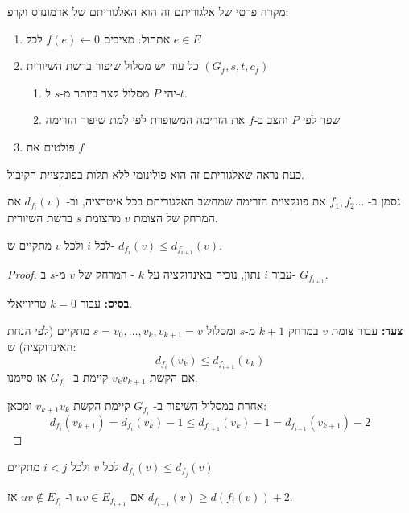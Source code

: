 מקרה פרטי של אלגוריתם זה הוא האלגוריתם של אדמונדס וקרפ:

\begin{enumerate}
\item
אתחול: מציבים 
$f(e) \leftarrow 0$
לכל
$e \in E$

\item
כל עוד יש מסלול שיפור ברשת השיורית
$(G_f, s, t, c_f)$
\begin{enumerate}
\item
יהי $P$ מסלול קצר ביותר מ-$s$ ל-$t$.
\item
שפר לפי $P$ והצב ב-$f$ את הזרימה המשופרת לפי למת שיפור הזרימה
\end{enumerate}
\item
פולטים את $f$
\end{enumerate}


כעת נראה שאלגוריתם זה הוא פולינומי ללא תלות בפונקציית הקיבול.

נסמן ב-%
$f_1, f_2 \ldots $
את פונקציית הזרימה שמחשב האלגוריתם בכל איטרציה, וב-%
$d_{f_i}(v)$
את המרחק של הצומת $v$ מהצומת $s$ ברשת השיורית.

\begin{claim}
לכל $i$ ולכל $v$ מתקיים ש-%
$d_{f_i}(v) \leq d_{f_{i+1}}(v)$.
\end{claim}

\begin{proof}
עבור $i$ נתון, נוכיח באינדוקציה על $k$ - המרחק של $v$ מ-$s$ ב-%
$G_{f_{i + 1}}$.

\textbf{בסיס:}
עבור 
$k=0$
טריוויאלי.

\textbf{צעד:}
עבור צומת $v$ במרחק 
$k + 1$ 
מ-$s$ ומסלול
$s = v_0, \ldots, v_k, v_{k + 1} = v$
מתקיים (לפי הנחת האינדוקציה) ש:
$$d_{f_i}(v_k) \leq d_{f_{i + 1}}(v_k)$$
אם הקשת 
$v_k v_{k + 1}$
קיימת ב-%
$G_{f_i}$
אז סיימנו.

אחרת במסלול השיפור ב-%
$G_{f_i}$
קיימת הקשת 
$v_{k+1}v_k$
ומכאן:
$$
d_{f_i}(v_{k + 1}) =
d_{f_i}(v_{k}) - 1 \leq 
d_{f_{i + 1}}(v_{k}) - 1 =
d_{f_{i + 1}}(v_{k + 1}) - 2
$$
\end{proof}

\begin{corollary}
לכל $v$ ולכל
$i < j$
מתקיים
$d_{f_i}(v) \leq d_{f_j}(v)$

\end{corollary}

\begin{corollary}
אם
$uv \in E_{f_{i + 1}}$
ו-%
$uv \notin E_{f_{i}}$
אז
$d_{f_{i + 1}}(v) \geq d(f_{i}(v)) + 2$.
\end{corollary}

